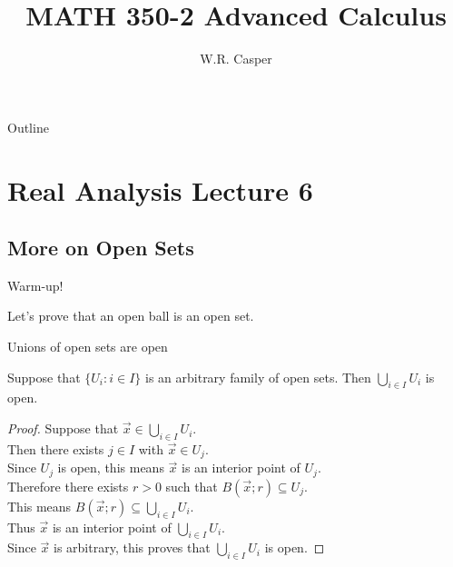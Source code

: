 \documentclass{beamer}
\title{MATH 350-2 Advanced Calculus}
\subtitle
{} %
\author[W.R. Casper] %
{W.R. Casper}
\institute[California State University Fullerton] %
{
  Department of Mathematics\\
  California State University Fullerton}
\begin{document}
\begin{frame}
  \titlepage
\end{frame}

\begin{frame}{Outline}
  \tableofcontents
\end{frame}



\section{Real Analysis Lecture 6}
\subsection{More on Open Sets}

\begin{frame}{Warm-up!}
\begin{prob}
Let's prove that an open ball is an open set.
\end{prob}
\end{frame}

\begin{frame}{Unions of open sets are open}
\begin{thm}
Suppose that $\{U_i: i\in I\}$ is an arbitrary family of open sets.
Then $\bigcup_{i\in I} U_i$ is open.
\end{thm}
\pause
\begin{proof}
\pause
Suppose that $\vec x\in \bigcup_{i\in I} U_i$.\\
\pause
Then there exists $j\in I$ with $\vec x\in U_j$.\\
\pause
Since $U_j$ is open, this means $\vec x$ is an interior point of $U_j$.\\
\pause
Therefore there exists $r>0$ such that $B(\vec x; r)\subseteq U_j$.\\
\pause
This means $B(\vec x; r)\subseteq \bigcup_{i\in I} U_i$.\\
\pause
Thus $\vec x$ is an interior point of $\bigcup_{i\in I} U_i$.\\
\pause
Since $\vec x$ is arbitrary, this proves that $\bigcup_{i\in I} U_i$ is open.
\end{proof}
\end{frame}
\end{document}
